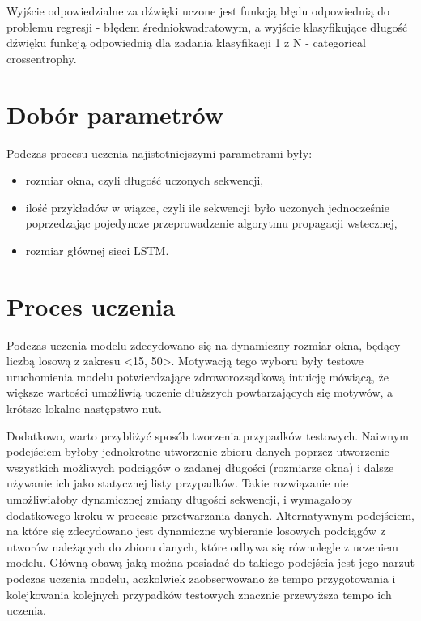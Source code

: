{{        Wyjście odpowiedzialne za dźwięki uczone jest funkcją błędu odpowiednią do problemu 
        regresji - błędem średniokwadratowym, a wyjście klasyfikujące długość dźwięku funkcją odpowiednią
        dla zadania klasyfikacji 1 z N - categorical crossentrophy.
    }

    \section{Dobór parametrów}
    {
        Podczas procesu uczenia najistotniejszymi parametrami były:
        \begin{itemize}
            \item rozmiar okna, czyli długość uczonych sekwencji,
            \item ilość przykładów w wiązce, czyli ile sekwencji było uczonych jednocześnie
            poprzedzając pojedyncze przeprowadzenie algorytmu propagacji wstecznej,
            \item rozmiar głównej sieci LSTM.
        \end{itemize}
    }

    \section{Proces uczenia}
    {
        Podczas uczenia modelu zdecydowano się na dynamiczny rozmiar okna,
        będący liczbą losową z zakresu <15, 50>. Motywacją tego wyboru były testowe 
        uruchomienia modelu potwierdzające zdroworozsądkową intuicję mówiącą, że większe wartości
        umożliwią uczenie dłuższych powtarzających się motywów, a krótsze lokalne następstwo nut.

        Dodatkowo, warto przybliżyć sposób tworzenia przypadków testowych. Naiwnym podejściem byłoby
        jednokrotne utworzenie zbioru danych poprzez utworzenie wszystkich możliwych podciągów o zadanej
        długości (rozmiarze okna) i dalsze używanie ich jako statycznej listy przypadków. 
        Takie rozwiązanie nie umożliwiałoby dynamicznej zmiany długości sekwencji, i wymagałoby dodatkowego 
        kroku w procesie przetwarzania danych. Alternatywnym podejściem, na które się zdecydowano jest dynamiczne
        wybieranie losowych podciągów z utworów należących do zbioru danych, które odbywa się równolegle z uczeniem modelu. 
        Główną obawą jaką można posiadać do takiego podejścia jest jego narzut podczas uczenia modelu, 
        aczkolwiek zaobserwowano że tempo przygotowania i kolejkowania kolejnych przypadków testowych znacznie przewyższa tempo ich uczenia.

}}

